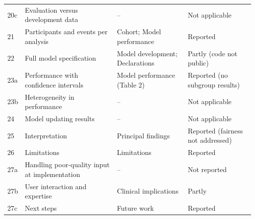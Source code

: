 \documentclass[10pt,a4paper,twocolumn]{article}
\begin{document}
\begin{longtable}{@{}l p{} p{} p{}@{}}
20c & Evaluation versus development data & -- & Not applicable \\
21 & Participants and events per analysis & Cohort; Model performance & Reported \\
22 & Full model specification & Model development; Declarations & Partly (code not public) \\
23a & Performance with confidence intervals & Model performance (Table 2) & Reported (no subgroup results) \\
23b & Heterogeneity in performance & -- & Not applicable \\
24 & Model updating results & -- & Not applicable \\
25 & Interpretation & Principal findings & Reported (fairness not addressed) \\
26 & Limitations & Limitations & Reported \\
27a & Handling poor-quality input at implementation & -- & Not reported \\
27b & User interaction and expertise & Clinical implications & Partly \\
27c & Next steps & Future work & Reported \\
\bottomrule
\end{longtable}
\end{document}
